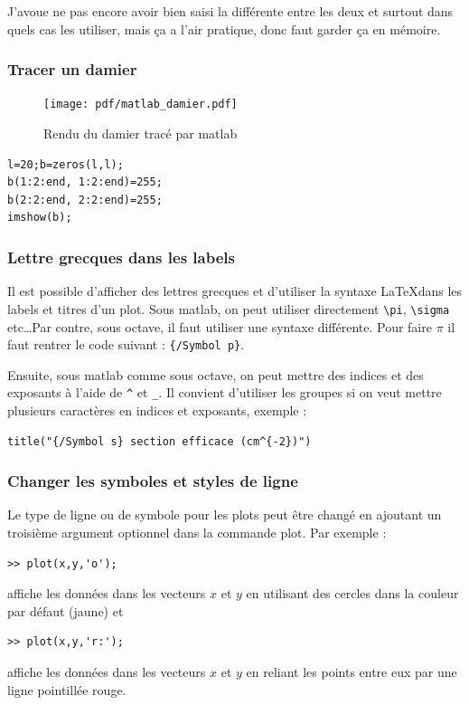 \documentclass[a4paper,twoside]{article}
\begin{document}
J'avoue ne pas encore avoir bien saisi la différente entre les deux et surtout dans quels cas les utiliser, mais ça a l'air pratique, donc faut garder ça en mémoire.

\subsubsection{Tracer un damier}
\begin{figure}[htb]
\centering
\texttt{[image: pdf/matlab\_damier.pdf]}
\caption{Rendu du damier tracé par matlab}
\end{figure}

\begin{verbatim}
l=20;b=zeros(l,l);
b(1:2:end, 1:2:end)=255;
b(2:2:end, 2:2:end)=255;
imshow(b);
\end{verbatim}

\subsubsection{Lettre grecques dans les labels}
Il est possible d'afficher des lettres grecques et d'utiliser la syntaxe \LaTeX dans les labels et titres d'un plot. Sous matlab, on peut utiliser directement \verb|\pi|, \verb|\sigma| etc\dots Par contre, sous octave, il faut utiliser une syntaxe différente. Pour faire $\pi$ il faut rentrer le code suivant : \verb|{/Symbol p}|.

Ensuite, sous matlab comme sous octave, on peut mettre des indices et des exposants à l'aide de \verb|^| et \verb|_|. Il convient d'utiliser les groupes si on veut mettre plusieurs caractères en indices et exposants, exemple :

\begin{verbatim}
title("{/Symbol s} section efficace (cm^{-2})")
\end{verbatim}

\subsubsection{Changer les symboles et styles de ligne}

Le type de ligne ou de symbole pour les plots peut être changé en ajoutant un troisième argument optionnel dans la commande plot. Par exemple :
\begin{verbatim}
>> plot(x,y,'o');
\end{verbatim}
affiche les données dans les vecteurs $x$ et $y$ en utilisant des cercles dans la couleur par défaut (jaune) et
\begin{verbatim}
>> plot(x,y,'r:');
\end{verbatim}
affiche les données dans les vecteurs $x$ et $y$ en reliant les points entre eux par une ligne pointillée rouge.
\end{document}
